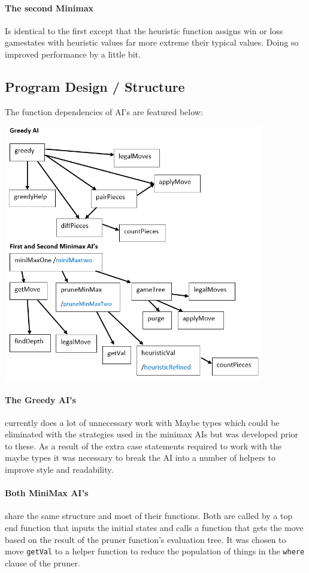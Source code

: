 \documentclass[11pt]{article}
\begin{document}
\paragraph*{The second Minimax} Is identical to the first except that the heuristic function assigns win or loss gamestates with heuristic values far more extreme their typical values. Doing so improved performance by a little bit.

\newpage
\subsection{Program Design / Structure}
The function dependencies of AI's are featured below:
\begin{center}
  \includegraphics[width=0.85\textwidth]{functDep.png}
\end{center}

\paragraph{The Greedy AI's} currently does a lot of unnecessary work with Maybe types which could be eliminated with the strategies used in the minimax AIs but was developed prior to these. As a result of the extra case statements required to work with the maybe types it was necessary to break the AI into a number of helpers to improve style and readability.

\paragraph{Both MiniMax AI's} share the same structure and most of their functions. Both are called by a top end function that inputs the initial states and calls a function that gets the move based on the result of the pruner function's evaluation tree. It was chosen to move \verb|getVal| to a helper function to reduce the population of things in the \verb|where| clause of the pruner.
\end{document}
